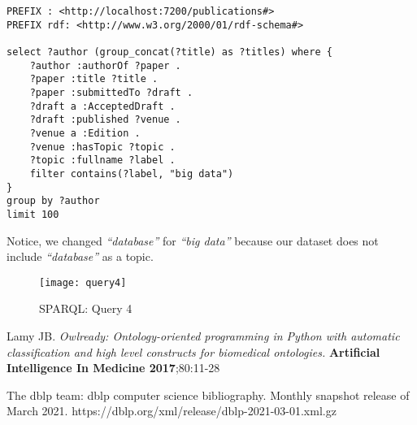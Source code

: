 \documentclass[12pt, a4paper]{article}
\begin{document}
\begin{verbatim}
PREFIX : <http://localhost:7200/publications#>
PREFIX rdf: <http://www.w3.org/2000/01/rdf-schema#>

select ?author (group_concat(?title) as ?titles) where {
    ?author :authorOf ?paper .
    ?paper :title ?title .
    ?paper :submittedTo ?draft .
    ?draft a :AcceptedDraft .
    ?draft :published ?venue .
    ?venue a :Edition .
    ?venue :hasTopic ?topic .
    ?topic :fullname ?label .
    filter contains(?label, "big data")
}
group by ?author
limit 100
\end{verbatim}

Notice, we changed \textit{``database''} for \textit{``big data''} because our dataset does not include \textit{``database''} as a topic.

\begin{figure}[H]
  \centering
  \texttt{[image: query4]}
  \caption{SPARQL: Query 4}
  \label{fig:query4}
\end{figure}

\begin{thebibliography}{99}

 Lamy JB. \textit{Owlready: Ontology-oriented programming in Python with automatic classification and high level constructs for biomedical ontologies.} \textbf{Artificial Intelligence In Medicine 2017};80:11-28

 The dblp team: dblp computer science bibliography. Monthly snapshot release of March 2021.
https://dblp.org/xml/release/dblp-2021-03-01.xml.gz

\end{thebibliography}
\end{document}
